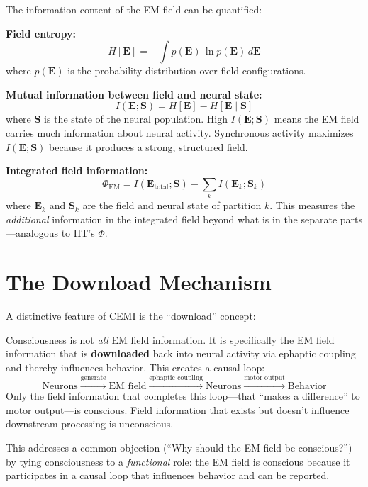 \documentclass[11pt,a4paper]{report}
\begin{document}
The information content of the EM field can be quantified:

\begin{mathbox}
\vspace{-6pt}
\textbf{Field entropy:}
\[
  H[\mathbf{E}] = -\int p(\mathbf{E})\, \ln p(\mathbf{E})\, d\mathbf{E}
\]
where $p(\mathbf{E})$ is the probability distribution over field configurations.

\textbf{Mutual information between field and neural state:}
\[
  I(\mathbf{E}; \mathbf{S}) = H[\mathbf{E}] - H[\mathbf{E} \mid \mathbf{S}]
\]
where $\mathbf{S}$ is the state of the neural population. High $I(\mathbf{E}; \mathbf{S})$ means the EM field carries much information about neural activity. Synchronous activity maximizes $I(\mathbf{E}; \mathbf{S})$ because it produces a strong, structured field.

\textbf{Integrated field information:}
\[
  \Phi_{\text{EM}} = I(\mathbf{E}_{\text{total}}; \mathbf{S}) - \sum_k I(\mathbf{E}_k; \mathbf{S}_k)
\]
where $\mathbf{E}_k$ and $\mathbf{S}_k$ are the field and neural state of partition $k$. This measures the \emph{additional} information in the integrated field beyond what is in the separate parts---analogous to IIT's $\Phi$.
\vspace{-4pt}
\end{mathbox}

\section{The Download Mechanism}

A distinctive feature of CEMI is the ``download'' concept:

\begin{principlebox}
Consciousness is not \emph{all} EM field information. It is specifically the EM field information that is \textbf{downloaded} back into neural activity via ephaptic coupling and thereby influences behavior. This creates a causal loop:
\[
  \text{Neurons} \xrightarrow{\text{generate}} \text{EM field} \xrightarrow{\text{ephaptic coupling}} \text{Neurons} \xrightarrow{\text{motor output}} \text{Behavior}
\]
Only the field information that completes this loop---that ``makes a difference'' to motor output---is conscious. Field information that exists but doesn't influence downstream processing is unconscious.
\end{principlebox}

This addresses a common objection (``Why should the EM field be conscious?'') by tying consciousness to a \emph{functional} role: the EM field is conscious because it participates in a causal loop that influences behavior and can be reported.
\end{document}
